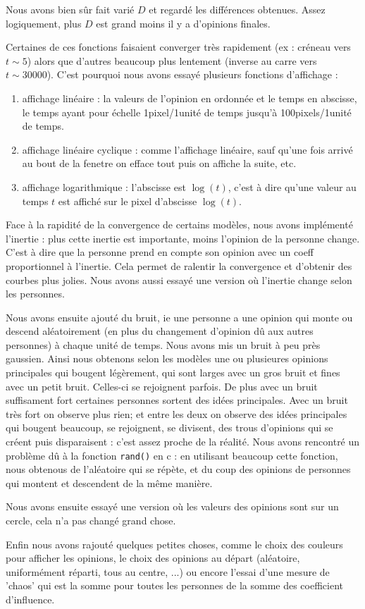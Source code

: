 \documentclass[a4paper,10pt]{report}
\begin{document}
Nous avons bien sûr fait varié $D$ et regardé les différences obtenues. Assez logiquement, plus $D$ est grand moins il y a d'opinions finales.

Certaines de ces fonctions faisaient converger très rapidement (ex : créneau vers $t \sim 5$) alors que d'autres beaucoup plus lentement (inverse au carre vers $t \sim 30000$). C'est pourquoi nous avons essayé plusieurs fonctions d'affichage :
\begin{enumerate}
\item affichage linéaire : la valeurs de l'opinion en ordonnée et le temps en abscisse, le temps ayant pour échelle 1pixel/1unité de temps jusqu'à 100pixels/1unité de temps.

\item affichage linéaire cyclique : comme l'affichage linéaire, sauf qu'une fois arrivé au bout de la fenetre on efface tout puis on affiche la suite, etc.

\item affichage logarithmique : l'abscisse est $\log(t)$, c'est à dire qu'une valeur au temps $t$ est affiché sur le pixel d'abscisse $\log(t)$.
\end{enumerate}

Face à la rapidité de la convergence de certains modèles, nous avons implé\-men\-té l'inertie : plus cette inertie est importante, moins l'opinion de la personne change. C'est à dire que la personne prend en compte son opinion avec un coeff proportionnel à l'inertie. Cela permet de ralentir la convergence et d'obtenir des courbes plus jolies.
Nous avons aussi essayé une version où l'inertie change selon les personnes.

Nous avons ensuite ajouté du bruit, ie une personne a une opinion qui monte ou descend aléatoirement (en plus du changement d'opinion dû aux autres personnes) à chaque unité de temps. Nous avons mis un bruit à peu près gaussien. Ainsi nous obtenons selon les modèles une ou plusieures opinions principales qui bougent légèrement, qui sont larges avec un gros bruit et fines avec un petit bruit. Celles-ci se rejoignent parfois. De plus avec un bruit suffisament fort certaines personnes sortent des idées principales. Avec un bruit très fort on observe plus rien; et entre les deux on observe des idées principales qui bougent beaucoup, se rejoignent, se divisent, des trous d'opinions qui se créent puis disparaisent : c'est assez proche de la réalité.
Nous avons rencontré un problème dû à la fonction \texttt{rand()} en c : en utilisant beaucoup cette fonction, nous obtenous de l'aléatoire qui se répète, et du coup des opinions de personnes qui montent et descendent de la même manière.

Nous avons ensuite essayé une version où les valeurs des opinions sont sur un cercle, cela n'a pas changé grand chose.

Enfin nous avons rajouté quelques petites choses, comme le choix des couleurs pour afficher les opinions, le choix des opinions au départ (aléatoire, uniformément réparti, tous au centre, ...) ou encore l'essai d'une mesure de 'chaos' qui est la somme pour toutes les personnes de la somme des coefficient d'influence.
\end{document}
